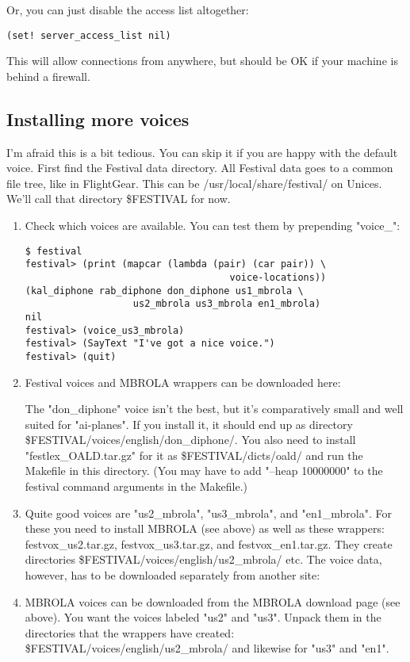 Or, you can just disable the access list altogether:

\begin{verbatim}
(set! server_access_list nil)
\end{verbatim}

This will allow connections from anywhere, but should be OK if your machine is behind a
firewall.

\subsection{Installing more voices}

I'm afraid this is a bit tedious. You can skip it if you are happy with the default voice.
First find the Festival data directory. All Festival data goes to a common file tree,
like in FlightGear. This can be /usr/local/share/festival/ on Unices. We'll call that
directory \$FESTIVAL for now.

\begin{enumerate}
\item Check which voices are available. You can test them by prepending "voice\_":

\begin{verbatim}
$ festival
festival> (print (mapcar (lambda (pair) (car pair)) \
                                    voice-locations))
(kal_diphone rab_diphone don_diphone us1_mbrola \
                   us2_mbrola us3_mbrola en1_mbrola)
nil
festival> (voice_us3_mbrola)
festival> (SayText "I've got a nice voice.")
festival> (quit)
\end{verbatim}

\item Festival voices and MBROLA wrappers can be downloaded here:

\web{http://festvox.org/packed/festival/1.95/}

The "don\_diphone" voice isn't the best,
but it's comparatively small and well suited for "ai-planes". If you install it,
it should end up as directory \$FESTIVAL/voices/english/don\_diphone/.
You also need to install "festlex\_OALD.tar.gz" for it as \$FESTIVAL/dicts/oald/ and
run the Makefile in this directory. (You may have to add "--heap 10000000" to the
festival command arguments in the Makefile.)

\item Quite good voices are "us2\_mbrola", "us3\_mbrola", and "en1\_mbrola". For these you need to
install MBROLA (see above) as well as these wrappers: festvox\_us2.tar.gz, festvox\_us3.tar.gz,
and festvox\_en1.tar.gz. They create directories \$FESTIVAL/voices/english/us2\_mbrola/ etc.
The voice data, however, has to be downloaded separately from another site:

\item MBROLA voices can be downloaded from the MBROLA download page (see above).
You want the voices labeled "us2" and "us3". Unpack them in the directories that
the wrappers have created: \$FESTIVAL/voices/english/us2\_mbrola/ and likewise for "us3" and "en1".

\end{enumerate}

